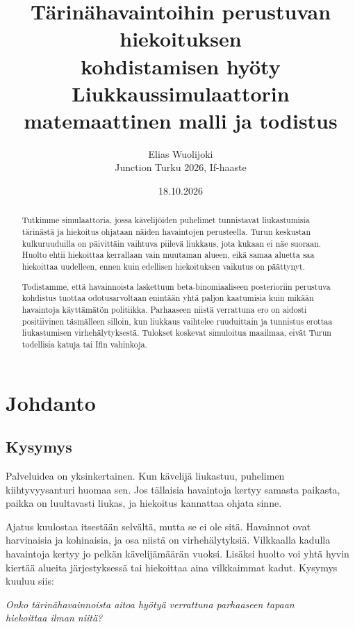 \documentclass[11pt,a4paper]{article}
\title{\textbf{Tärinähavaintoihin perustuvan hiekoituksen\\ kohdistamisen hyöty}\\[6pt]
\large Liukkaussimulaattorin matemaattinen malli ja todistus}
\author{Elias Wuolijoki\\[2pt] \small Junction Turku 2026, If-haaste}
\date{18.10.2026}
\theoremstyle{plain}
\theoremstyle{definition}
\theoremstyle{remark}
\newcommand{\1}{\mathbf{1}}
\begin{document}
\maketitle

\begin{abstract}
\noindent
Tutkimme simulaattoria, jossa kävelijöiden puhelimet tunnistavat liukastumisia
tärinästä ja hiekoitus ohjataan näiden havaintojen perusteella. Turun keskustan
kulkuruuduilla on päivittäin vaihtuva piilevä liukkaus, jota kukaan ei näe
suoraan. Huolto ehtii hiekoittaa kerrallaan vain muutaman alueen, eikä samaa
aluetta saa hiekoittaa uudelleen, ennen kuin edellisen hiekoituksen vaikutus
on päättynyt.

Todistamme, että havainnoista laskettuun beta-binomiaaliseen posterioriin
perustuva kohdistus tuottaa odotusarvoltaan enintään yhtä paljon kaatumisia kuin
mikään havaintoja käyttämätön politiikka. Parhaaseen niistä verrattuna ero on
aidosti positiivinen täsmälleen silloin, kun liukkaus vaihtelee ruuduittain ja
tunnistus erottaa liukastumisen virhehälytyksestä. Tulokset koskevat simuloitua
maailmaa, eivät Turun todellisia katuja tai Ifin vahinkoja.
\end{abstract}

\vspace{4pt}
\setcounter{tocdepth}{1}
{\small\tableofcontents}
\newpage

\section{Johdanto}

\subsection{Kysymys}

Palveluidea on yksinkertainen. Kun kävelijä liukastuu, puhelimen
kiihtyvyysanturi huomaa sen. Jos tällaisia havaintoja kertyy samasta paikasta,
paikka on luultavasti liukas, ja hiekoitus kannattaa ohjata sinne.

Ajatus kuulostaa itsestään selvältä, mutta se ei ole sitä. Havainnot ovat
harvinaisia ja kohinaisia, ja osa niistä on virhehälytyksiä. Vilkkaalla
kadulla havaintoja kertyy jo pelkän kävelijämäärän vuoksi. Lisäksi huolto voi
yhtä hyvin kiertää alueita järjestyksessä tai hiekoittaa aina vilkkaimmat
kadut. Kysymys kuuluu siis:

\begin{center}
\emph{Onko tärinähavainnoista aitoa hyötyä verrattuna parhaaseen tapaan\\ hiekoittaa ilman niitä?}
\end{center}
\end{document}
